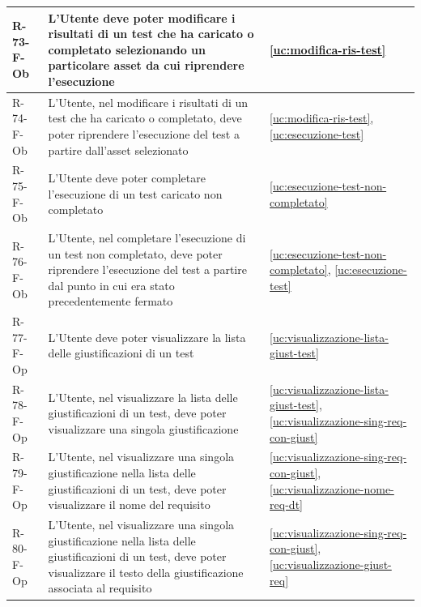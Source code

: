 ﻿\documentclass[a4paper,12pt]{article}
\begin{document}
{{\begin{longtable}{|l|p{}|p{}|}
            R-73-F-Ob       & L'Utente deve poter modificare i risultati di un test che ha caricato o completato selezionando un particolare asset da cui riprendere l'esecuzione                                         & \ref{uc:modifica-ris-test}                                               \\ \hline
            R-74-F-Ob       & L'Utente, nel modificare i risultati di un test che ha caricato o completato, deve poter riprendere l'esecuzione del test a partire dall'asset selezionato                                  & \ref{uc:modifica-ris-test}, \ref{uc:esecuzione-test}                       \\ \hline
            R-75-F-Ob       & L'Utente deve poter completare l'esecuzione di un test caricato non completato                                                                                                              & \ref{uc:esecuzione-test-non-completato}                                               \\ \hline
            R-76-F-Ob       & L'Utente, nel completare l'esecuzione di un test non completato, deve poter riprendere l'esecuzione del test a partire dal punto in cui era stato precedentemente fermato                   & \ref{uc:esecuzione-test-non-completato}, \ref{uc:esecuzione-test}                       \\ \hline
            R-77-F-Op       & L'Utente deve poter visualizzare la lista delle giustificazioni di un test                                                                                                                  & \ref{uc:visualizzazione-lista-giust-test}                                               \\ \hline
            R-78-F-Op       & L'Utente, nel visualizzare la lista delle giustificazioni di un test, deve poter visualizzare una singola giustificazione                                                                   & \ref{uc:visualizzazione-lista-giust-test}, \ref{uc:visualizzazione-sing-req-con-giust}                 \\ \hline
            R-79-F-Op       & L'Utente, nel visualizzare una singola giustificazione nella lista delle giustificazioni di un test, deve poter visualizzare il nome del requisito                                          & \ref{uc:visualizzazione-sing-req-con-giust}, \ref{uc:visualizzazione-nome-req-dt}             \\ \hline
            R-80-F-Op       & L'Utente, nel visualizzare una singola giustificazione nella lista delle giustificazioni di un test, deve poter visualizzare il testo della giustificazione associata al requisito          & \ref{uc:visualizzazione-sing-req-con-giust}, \ref{uc:visualizzazione-giust-req}         \\ \hline

\end{longtable}}}
\end{document}
